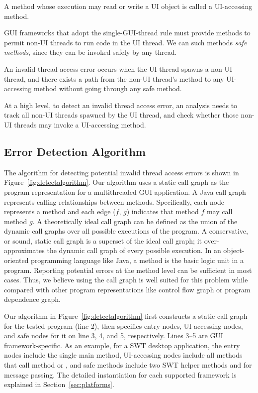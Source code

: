  { A method
whose execution may read or write a UI object is called a UI-accessing method.}\vspace{1mm}

 {GUI frameworks that
adopt the single-GUI-thread rule must provide methods to permit non-UI threads
to run code in the UI thread. We can such methods \textit{safe methods}, since
they can be invoked safely by any thread.}\vspace{1mm}

 {An invalid
thread access error occurs when the UI thread spawns a non-UI thread, and there
exists a path from the non-UI thread's  method to any UI-accessing method
without going through any safe method. }\vspace{2mm}

At a high level, to detect an invalid thread access error, an analysis needs to track all
non-UI threads spawned by the UI thread, and check whether those non-UI threads
may invoke a UI-accessing method.

\subsection{Error Detection Algorithm}

The algorithm for detecting potential invalid thread access errors
is shown in Figure~\ref{fig:detectalgorithm}. Our algorithm uses a
static call graph as the program representation for a multithreaded
GUI application. A Java call graph represents calling relationships
between methods. Specifically, each node represents a method and each
edge ($f$, $g$) indicates that method $f$ may call method $g$.
A theoretically ideal call graph can be defined as the union of the
dynamic call graphs over all possible executions of the program. 
A conservative, or sound, static call graph is a superset of
the ideal call graph; it over-approximates the
dynamic call graph of every possible execution. 
In an object-oriented programming language like
Java, a method is the basic logic unit in a program. Reporting
potential errors at the method level can be sufficient in most cases.
Thus, we believe using the call graph is well suited for this problem while
compared with other program representations like control flow graph or
program dependence graph. 


Our algorithm in Figure~\ref{fig:detectalgorithm} %
first constructs a static call graph for the tested program (line 2),
then specifies entry nodes, UI-accessing nodes, and safe nodes
for it on line 3, 4, and 5, respectively. Lines 3--5 are GUI framework-specific.
As an example, for a SWT desktop application, the entry nodes include
the single main method, UI-accessing nodes include all methods that
call method  or ,
and safe methods include two SWT helper methods   and
 for message passing. The detailed instantiation
for each supported framework is explained in Section~\ref{sec:platforms}.

